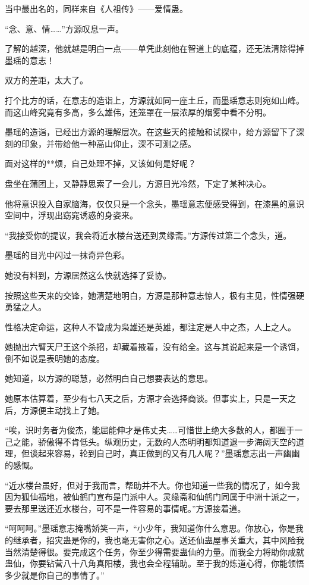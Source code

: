 \begin{this_body}
当中最出名的，同样来自《人祖传》——爱情蛊。

“念、意、情……”方源叹息一声。

了解的越深，他就越是明白一点——单凭此刻他在智道上的底蕴，还无法清除得掉墨瑶的意志！

双方的差距，太大了。

打个比方的话，在意志的造诣上，方源就如同一座土丘，而墨瑶意志则宛如山峰。而这山峰究竟有多高，多么雄伟，还笼罩在一层浓厚的烟雾中看不分明。

墨瑶的造诣，已经出方源的理解层次。在这些天的接触和试探中，给方源留下了深刻的印象，并带给他一种高山仰止，深不可测之感。

面对这样的**烦，自己处理不掉，又该如何是好呢？

盘坐在蒲团上，又静静思索了一会儿，方源目光冷然，下定了某种决心。

他将意识投入自家脑海，仅仅只是一个念头，墨瑶意志便感受得到，在漆黑的意识空间中，浮现出窈窕诱惑的身姿来。

“我接受你的提议，我会将近水楼台送还到灵缘斋。”方源传过第二个念头，道。

墨瑶的目光中闪过一抹奇异色彩。

她没有料到，方源居然这么快就选择了妥协。

按照这些天来的交锋，她清楚地明白，方源是那种意志惊人，极有主见，性情强硬勇猛之人。

性格决定命运，这种人不管成为枭雄还是英雄，都注定是人中之杰，人上之人。

她抛出六臂天尸王这个杀招，却藏着掖着，没有给全。这与其说起来是一个诱饵，倒不如说是表明她的态度。

她知道，以方源的聪慧，必然明白自己想要表达的意思。

她原本估算着，至少有七八天之后，方源才会选择商谈。但事实上，只是一天之后，方源便主动找上了她。

“唉，识时务者为俊杰，能屈能伸才是伟丈夫……可惜世上绝大多数的人，都囿于一己之能，骄傲得不肯低头。纵观历史，无数的人杰明明都知道退一步海阔天空的道理，但谈起来容易，轮到自己时，真正做到的又有几人呢？”墨瑶意志出一声幽幽的感慨。

“近水楼台虽好，但对于我而言，帮助并不大。你也知道一些我的情况了，如今我因为狐仙福地，被仙鹤门宣布是门派中人。灵缘斋和仙鹤门同属于中洲十派之一，要去那里送还近水楼台，可不是一件容易的事情呢。”方源接着道。

“呵呵呵。”墨瑶意志掩嘴娇笑一声，“小少年，我知道你什么意思。你放心，你是我的继承者，招灾蛊是你的，我也毫无害你之心。送还仙蛊屋事关重大，其中风险我当然清楚得很。要完成这个任务，你至少得需要蛊仙的力量。而我全力将助你成就蛊仙，你要钻营八十八角真阳楼，我也会全程辅助。至于我的炼道心得，你能领悟多少就是你自己的事情了。”


\end{this_body}
